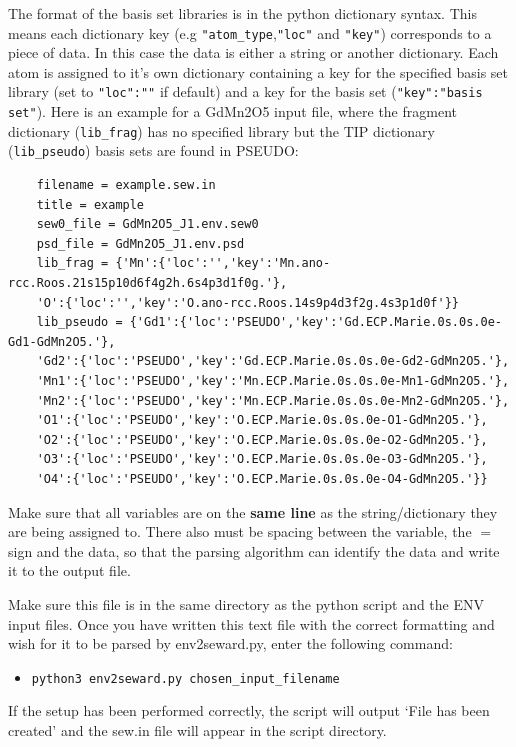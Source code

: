 \documentclass[10pt]{article}
\begin{document}
The format of the basis set libraries is in the python dictionary syntax. This means each dictionary key (e.g \texttt{"atom\_type},\texttt{"loc"} and \texttt{"key"}) corresponds to a piece of data. In this case the data is either a string or another dictionary. Each atom is assigned to it's own dictionary containing a key for the specified basis set library (set to \texttt{"loc":""} if default) and a key for the basis set (\texttt{"key":"basis set"}).
Here is an example for a GdMn2O5 input file, where the fragment dictionary (\texttt{lib\_frag}) has no specified library but the TIP dictionary (\texttt{lib\_pseudo}) basis sets are found in PSEUDO:

\begin{lstlisting}
	filename = example.sew.in
	title = example
	sew0_file = GdMn2O5_J1.env.sew0
	psd_file = GdMn2O5_J1.env.psd
	lib_frag = {'Mn':{'loc':'','key':'Mn.ano-rcc.Roos.21s15p10d6f4g2h.6s4p3d1f0g.'},
	'O':{'loc':'','key':'O.ano-rcc.Roos.14s9p4d3f2g.4s3p1d0f'}}
	lib_pseudo = {'Gd1':{'loc':'PSEUDO','key':'Gd.ECP.Marie.0s.0s.0e-Gd1-GdMn2O5.'},
	'Gd2':{'loc':'PSEUDO','key':'Gd.ECP.Marie.0s.0s.0e-Gd2-GdMn2O5.'},
	'Mn1':{'loc':'PSEUDO','key':'Mn.ECP.Marie.0s.0s.0e-Mn1-GdMn2O5.'},
	'Mn2':{'loc':'PSEUDO','key':'Mn.ECP.Marie.0s.0s.0e-Mn2-GdMn2O5.'},
	'O1':{'loc':'PSEUDO','key':'O.ECP.Marie.0s.0s.0e-O1-GdMn2O5.'},
	'O2':{'loc':'PSEUDO','key':'O.ECP.Marie.0s.0s.0e-O2-GdMn2O5.'},
	'O3':{'loc':'PSEUDO','key':'O.ECP.Marie.0s.0s.0e-O3-GdMn2O5.'},
	'O4':{'loc':'PSEUDO','key':'O.ECP.Marie.0s.0s.0e-O4-GdMn2O5.'}}
\end{lstlisting}
Make sure that all variables are on the {\bf same line} as the string/dictionary they are being assigned to. There also must be spacing between the variable, the $=$ sign and the data, so that the parsing algorithm can identify the data and write it to the output file.

Make sure this file is in the same directory as the python script and the ENV input files. Once you have written this text file with the correct formatting and wish for it to be parsed by env2seward.py, enter the following command:

\begin{itemize}
	\item \texttt{python3 env2seward.py chosen\_input\_filename}
\end{itemize}

If the setup has been performed correctly, the script will output `File has been created' and the sew.in file will appear in the script directory.
\end{document}
